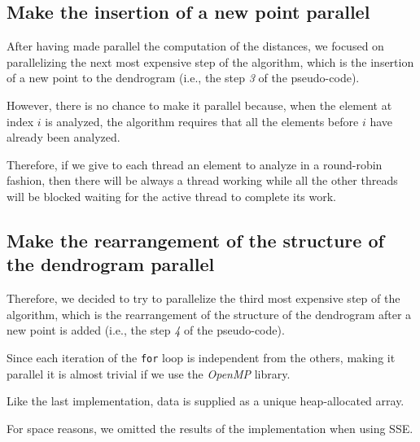 \documentclass{article}
\begin{document}
\hypertarget{stage-3-parallel}{
\subsection{Make the insertion of a new point parallel}
\label{stage-3-parallel}}

After having made parallel the computation of the distances, we focused on parallelizing the
next most expensive step of the algorithm, which is the insertion of a new point to
the dendrogram (i.e., the step \textit{3} of the pseudo-code).

However, there is no chance to make it parallel because, when the element at index $i$ is
analyzed, the algorithm requires that all the elements before $i$ have already been analyzed.

Therefore, if we give to each thread an element to analyze in a round-robin fashion, then there will
be always a thread working while all the other threads will be blocked waiting for the active
thread to complete its work.

\hypertarget{stage-4-parallel}{
\subsection{Make the rearrangement of the structure of the dendrogram parallel}
\label{stage-4-parallel}}

Therefore, we decided to try to parallelize the third most expensive step of the algorithm, which
is the rearrangement of the structure of the
dendrogram after a new point is added (i.e., the step \textit{4} of the pseudo-code).

Since each iteration of the \texttt{for} loop is independent from the others, making it parallel
it is almost trivial if we use the \emph{OpenMP} library.

Like the last implementation, data is supplied as a unique heap-allocated array.

For space reasons, we omitted the results of the implementation when using SSE.


\end{document}

